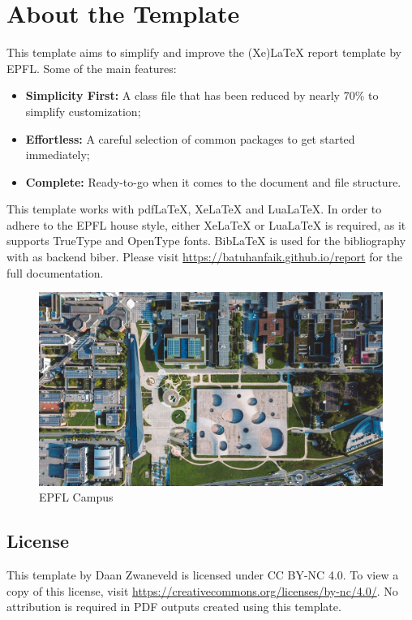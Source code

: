 \chapter{About the Template}

This template aims to simplify and improve the (Xe)LaTeX report template by EPFL. Some of the main features:

\begin{itemize}
  \item \textbf{Simplicity First:} A class file that has been reduced by nearly 70\% to simplify customization;
  \item \textbf{Effortless:} A careful selection of common packages to get started immediately;
  \item \textbf{Complete:} Ready-to-go when it comes to the document and file structure.
\end{itemize}

\noindent This template works with pdfLaTeX, XeLaTeX and LuaLaTeX. In order to adhere to the EPFL house style, either XeLaTeX or LuaLaTeX is required, as it supports TrueType and OpenType fonts. BibLaTeX is used for the bibliography with as backend biber. Please visit \url{https://batuhanfaik.github.io/report} for the full documentation.

\begin{figure}[h]
    \centering
    \includegraphics[width=0.95\linewidth]{Tex/Parts/figures/campus.jpg}
    \caption{EPFL Campus}
\end{figure}

\section*{License}

This template by Daan Zwaneveld is licensed under CC BY-NC 4.0. To view a copy of this license, visit \url{https://creativecommons.org/licenses/by-nc/4.0/}. No attribution is required in PDF outputs created using this template.

